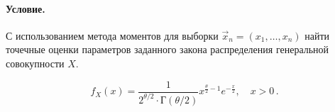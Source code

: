 
\paragraph{Условие.} С использованием метода моментов для выборки $\vec{x}_n = (x_1, \dots, x_n)$ найти точечные оценки параметров заданного закона распределения генеральной совокупности $X$.

\[
    f_X (x) = \frac{1}{2^{\theta/2} \cdot \textsf{Г} (\theta/2)} x^{\frac{\theta}{2} - 1} e^{-\frac{x}{2}}, \quad x > 0\,.
\]